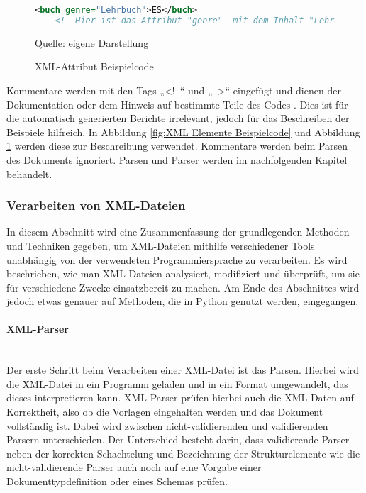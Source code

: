 \begin{figure}[H]
\centering
\begin{minipage}{0.95\textwidth}
\begin{lstlisting}[language=XML]
<buch genre="Lehrbuch">ES</buch>
    <!--Hier ist das Attribut "genre"  mit dem Inhalt "Lehrbuch"-->
\end{lstlisting}
\end{minipage}
\caption{XML-Attribut Beispielcode}
\label{fig: XML Attribute Beispielcode}
    {Quelle: eigene Darstellung}
\end{figure}

Kommentare werden mit den Tags „<!--“ und „-->“ eingefügt und dienen der Dokumentation oder dem Hinweis auf bestimmte Teile des Codes \cite*[10-14]{Becher2022}.
Dies ist für die automatisch generierten Berichte irrelevant, jedoch für das Beschreiben der Beispiele hilfreich.
In Abbildung \ref{fig:XML Elemente Beispielcode} und Abbildung \ref{fig: XML Attribute Beispielcode} werden diese zur Beschreibung verwendet.
Kommentare werden beim Parsen des Dokuments ignoriert.
Parsen und Parser werden im nachfolgenden Kapitel behandelt.

\subsubsection{Verarbeiten von XML-Dateien}
In diesem Abschnitt wird eine Zusammenfassung der grundlegenden Methoden und Techniken gegeben,
um \ac{XML}-Dateien mithilfe verschiedener Tools unabhängig von der verwendeten Programmiersprache zu verarbeiten.
Es wird beschrieben, wie man \ac{XML}-Dateien analysiert, modifiziert und überprüft, um sie für verschiedene Zwecke einsatzbereit zu machen.
Am Ende des Abschnittes wird jedoch etwas genauer auf Methoden, die in Python genutzt werden, eingegangen.


\paragraph{XML-Parser}\mbox{}\\

Der erste Schritt beim Verarbeiten einer \ac{XML}-Datei ist das Parsen.
Hierbei wird die \ac{XML}-Datei in ein Programm geladen und in ein Format umgewandelt, das dieses interpretieren kann.
XML-Parser prüfen hierbei auch die \ac{XML}-Daten auf Korrektheit, also ob die Vorlagen eingehalten werden und das Dokument vollständig ist.
Dabei wird zwischen nicht-validierenden und validierenden Parsern unterschieden.
Der Unterschied besteht darin, dass validierende Parser neben der korrekten Schachtelung und Bezeichnung der Strukturelemente
wie die nicht-validierende Parser auch noch auf eine Vorgabe einer Dokumenttypdefinition oder eines Schemas prüfen. \cite*[10]{Becher2022}

